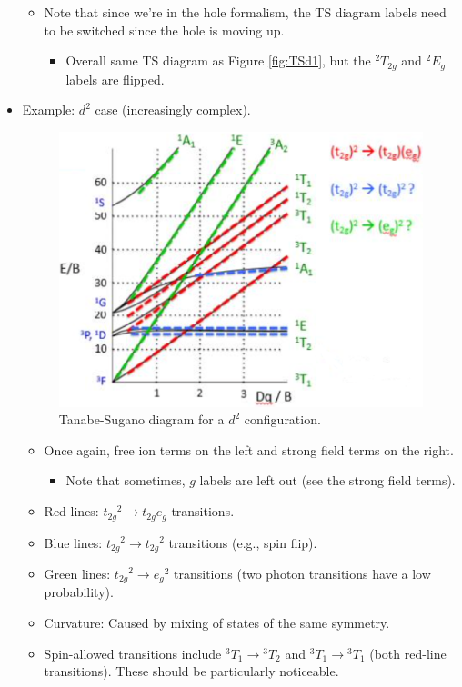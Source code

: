 \documentclass[../notes.tex]{subfiles}
\begin{document}
\begin{itemize}
\begin{itemize}
        \item Note that since we're in the hole formalism, the TS diagram labels need to be switched since the hole is moving up.
        \begin{itemize}
            \item Overall same TS diagram as Figure \ref{fig:TSd1}, but the ${}^2T_{2g}$ and ${}^2E_g$ labels are flipped.
        \end{itemize}
    \end{itemize}
    \item Example: $d^2$ case (increasingly complex).
    \begin{figure}[h!]
        \centering
        \includegraphics[width=0.48\linewidth]{../ExtFiles/TSd2.png}
        \caption{Tanabe-Sugano diagram for a $d^2$ configuration.}
        \label{fig:TSd2}
    \end{figure}
    \begin{itemize}
        \item Once again, free ion terms on the left and strong field terms on the right.
        \begin{itemize}
            \item Note that sometimes, $g$ labels are left out (see the strong field terms).
        \end{itemize}
        \item Red lines: ${t_{2g}}^2\to t_{2g}e_g$ transitions.
        \item Blue lines: ${t_{2g}}^2\to{t_{2g}}^2$ transitions (e.g., spin flip).
        \item Green lines: ${t_{2g}}^2\to{e_g}^2$ transitions (two photon transitions have a low probability).
        \item Curvature: Caused by mixing of states of the same symmetry.
        \item Spin-allowed transitions include ${}^3T_1\to{}^3T_2$ and ${}^3T_1\to{}^3T_1$ (both red-line transitions). These should be particularly noticeable.
    \end{itemize}

\end{itemize}
\end{document}
